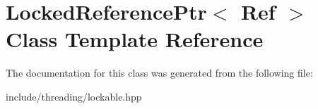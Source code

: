 \hypertarget{class_locked_reference_ptr}{\section{Locked\-Reference\-Ptr$<$ Ref $>$ Class Template Reference}
\label{class_locked_reference_ptr}
}


The documentation for this class was generated from the following file\-:\begin{DoxyCompactItemize}
\item 
include/threading/lockable.\-hpp\end{DoxyCompactItemize}

